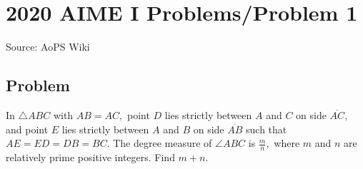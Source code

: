 \documentclass[12pt]{article}
\begin{document}
\section*{{2020 AIME I Problems/Problem 1}}
Source: AoPS Wiki

\subsection*{Problem}
In $\triangle ABC$ with $AB=AC,$ point $D$ lies strictly between $A$ and $C$ on side $\overline{AC},$ and point $E$ lies strictly between $A$ and $B$ on side $\overline{AB}$ such that $AE=ED=DB=BC.$ The degree measure of $\angle ABC$ is $\tfrac{m}{n},$ where $m$ and $n$ are relatively prime positive integers. Find $m+n.$
\end{document}
